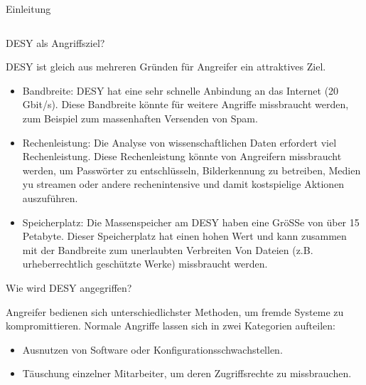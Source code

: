 \documentclass[final]{beamer}
\newlength{\sepwid}
\newlength{\twocolwid}
\begin{document}
\begin{frame}[t]
\begin{columns}[t, totalwidth=\textwidth]
\begin{column}{\twocolwid}
\begin{block}{Einleitung}
\end{block}


\begin{column}{\sepwid}\end{column} %

\begin{alertblock}{DESY als Angriffsziel?}
\small{
DESY ist gleich aus mehreren Gründen für Angreifer ein attraktives Ziel. 

\begin{itemize}
\item Bandbreite: DESY hat eine sehr schnelle Anbindung an das Internet 
(20 Gbit/s). Diese Bandbreite könnte für weitere Angriffe missbraucht 
werden, zum Beispiel zum massenhaften Versenden von Spam.

\item Rechenleistung: Die Analyse von wissenschaftlichen Daten erfordert 
viel Rechenleistung. Diese Rechenleistung könnte von Angreifern missbraucht werden,
um Passwörter zu entschlüsseln, Bilderkennung zu betreiben, Medien yu streamen oder andere rechenintensive und damit kostspielige Aktionen auszuführen.

\item  Speicherplatz: Die Massenspeicher am DESY haben eine GröSSe von über 
15 Petabyte. Dieser Speicherplatz hat einen hohen Wert und kann zusammen 
mit der Bandbreite zum unerlaubten Verbreiten Von Dateien (z.B. urheberrechtlich 
geschützte Werke) missbraucht werden.

\end{itemize}
}
\end{alertblock}


\begin{block}{Wie wird DESY angegriffen?}

Angreifer bedienen sich unterschiedlichster Methoden, um fremde Systeme zu 
kompromittieren. Normale Angriffe lassen sich in zwei Kategorien aufteilen:

\begin{itemize}
 \item Ausnutzen von Software oder Konfigurationsschwachstellen.
 \item Täuschung einzelner Mitarbeiter, um deren Zugriffsrechte zu missbrauchen.
\end{itemize}


\end{block}
\end{column}
\end{columns}
\end{frame}
\end{document}

